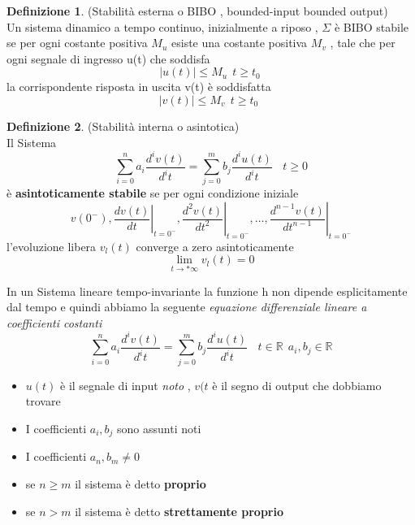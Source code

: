 \documentclass{article}
\theoremstyle{definition}
\newtheorem*{definizione}{Definizione}
\newcommand{\R}{\mathbb{R}}
\begin{document}
\begin{definizione}(Stabilità esterna o BIBO , bounded-input bounded output)\\
Un sistema dinamico a tempo continuo,  inizialmente a riposo  , $\Sigma$ è BIBO stabile se per ogni costante positiva $M_u$ esiste una costante positiva $M_v$ , tale che per ogni segnale di ingresso u(t) che soddisfa 
$$|u(t)|\leq M_u \ \  t \geq t_0\ $$
la corrispondente risposta in uscita v(t) è soddisfatta 
$$|v(t)|\leq M_v \ \  t \geq t_0\ \  $$
\end{definizione}
\begin{definizione}(Stabilità interna o asintotica)\\
	Il Sistema $$\sum_{i=0}^{n}a_i \frac{d^i v(t)}{d^it}=\sum_{j=0}^{m}b_j \frac{d^i u(t)}{d^it}  \ \ \ \ t \geq 0	$$ è \textbf{asintoticamente stabile } se per ogni condizione iniziale $$v\left(0^{-}\right),\left.\frac{d v(t)}{d t}\right|_{t=0^{-}},\left.\frac{d^2 v(t)}{d t^2}\right|_{t=0^{-}}, \ldots,\left.\frac{d^{n-1} v(t)}{d t^{n-1}}\right|_{t=0^{-}}
	$$ l'evoluzione libera $v_l(t)$ converge a zero asintoticamente 
	$$\lim_{t \rightarrow *\infty }v_l(t)=0$$
\end{definizione}
\newpage
In un Sistema lineare tempo-invariante la funzione h non dipende esplicitamente dal tempo e quindi abbiamo la seguente \textit{equazione differenziale lineare a coefficienti costanti } 
$$\sum_{i=0}^{n}a_i \frac{d^i v(t)}{d^it}=\sum_{j=0}^{m}b_j \frac{d^i u(t)}{d^it}  \ \ \ \ t \in \R \ \ a_i,b_j \in \R	$$
\begin{itemize}
	\item $u(t)$ è il segnale di input \textit{noto} , $v(t$ è il segno di output che dobbiamo trovare 
	\item I coefficienti $a_i,b_j$ sono assunti noti 
	\item I coefficienti $a_n,b_m \neq 0$
	\item se $n \geq m$ il sistema è detto \textbf{proprio}
	\item se $n > m $ il sistema è detto \textbf{strettamente proprio }
\end{itemize}
\end{document}
